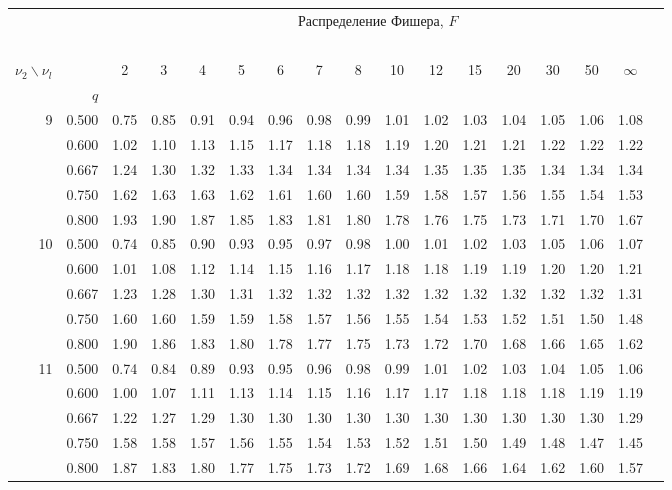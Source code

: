 {\newpage


\begin{center}
\begin{tabular}{rrr@{\,}r@{\,}r@{\,}r@{\,}r@{\,}r@{\,}r@{\,}r
                   @{\,}r@{\,}r@{\,}r@{\,}r@{\,}r@{\,}r@{\,}r}
&&\multicolumn{14}{c}{Распределение Фишера, $F$}\\
\ \\
$\nu_2\backslash\nu_l$ & & 
\multicolumn{1}{c}{2} &\multicolumn{1}{c}{3} &
\multicolumn{1}{c}{4} &\multicolumn{1}{c}{5} &
\multicolumn{1}{c}{6} &\multicolumn{1}{c}{7} &
\multicolumn{1}{c}{8} &\multicolumn{1}{c}{10}&
\multicolumn{1}{c}{12}&\multicolumn{1}{c}{15}&
\multicolumn{1}{c}{20}&\multicolumn{1}{c}{30}&
\multicolumn{1}{c}{50}&\multicolumn{1}{c}{$\infty$}\\
& $q$ \\
 9&0.500&0.75&0.85&0.91&0.94&0.96&0.98&0.99&1.01&1.02&1.03&1.04&1.05&1.06&1.08\\
  &0.600&1.02&1.10&1.13&1.15&1.17&1.18&1.18&1.19&1.20&1.21&1.21&1.22&1.22&1.22\\
  &0.667&1.24&1.30&1.32&1.33&1.34&1.34&1.34&1.34&1.35&1.35&1.35&1.34&1.34&1.34\\
  &0.750&1.62&1.63&1.63&1.62&1.61&1.60&1.60&1.59&1.58&1.57&1.56&1.55&1.54&1.53\\
  &0.800&1.93&1.90&1.87&1.85&1.83&1.81&1.80&1.78&1.76&1.75&1.73&1.71&1.70&1.67\\
10&0.500&0.74&0.85&0.90&0.93&0.95&0.97&0.98&1.00&1.01&1.02&1.03&1.05&1.06&1.07\\
  &0.600&1.01&1.08&1.12&1.14&1.15&1.16&1.17&1.18&1.18&1.19&1.19&1.20&1.20&1.21\\
  &0.667&1.23&1.28&1.30&1.31&1.32&1.32&1.32&1.32&1.32&1.32&1.32&1.32&1.32&1.31\\
  &0.750&1.60&1.60&1.59&1.59&1.58&1.57&1.56&1.55&1.54&1.53&1.52&1.51&1.50&1.48\\
  &0.800&1.90&1.86&1.83&1.80&1.78&1.77&1.75&1.73&1.72&1.70&1.68&1.66&1.65&1.62\\
11&0.500&0.74&0.84&0.89&0.93&0.95&0.96&0.98&0.99&1.01&1.02&1.03&1.04&1.05&1.06\\
  &0.600&1.00&1.07&1.11&1.13&1.14&1.15&1.16&1.17&1.17&1.18&1.18&1.18&1.19&1.19\\
  &0.667&1.22&1.27&1.29&1.30&1.30&1.30&1.30&1.30&1.30&1.30&1.30&1.30&1.30&1.29\\
  &0.750&1.58&1.58&1.57&1.56&1.55&1.54&1.53&1.52&1.51&1.50&1.49&1.48&1.47&1.45\\
  &0.800&1.87&1.83&1.80&1.77&1.75&1.73&1.72&1.69&1.68&1.66&1.64&1.62&1.60&1.57\\

\end{tabular}
\end{center}}
